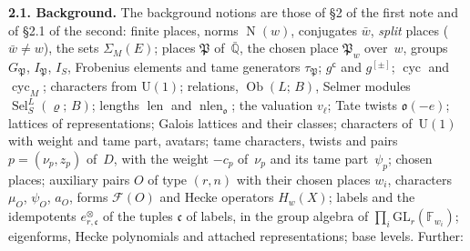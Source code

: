 \documentclass[11pt,a4paper]{article}
\newcommand{\F}{\mathbb{F}}
\newcommand{\len}{\operatorname{len}}
\newcommand{\m}[1]{\mbox{$#1$}}        %
\newcommand{\subhead}[1]{\par\addvspace{9pt plus 2pt}\Needspace{4\baselineskip}\noindent\textbf{#1}\enspace\ignorespaces}
\theoremstyle{plainx}
\theoremstyle{uprightx}
\newcommand{\Qb}{\bar{\mathbb{Q}}}
\newcommand{\cyc}{\operatorname{cyc}}
\newcommand{\vl}{v_\ell}
\newcommand{\Sel}[4]{\operatorname{Sel}_{#2}^{#3}(#1;\,#4)}
\newcommand{\Ob}[2]{\operatorname{Ob}(#1;\,#2)}
\newcommand{\pd}[2]{\Sigma_{#2}(#1)}
\newcommand{\inab}[1]{I_{#1}}
\newcommand{\cj}[1]{\bar{#1}}
\newcommand{\Nm}{\operatorname{N}}
\newcommand{\nlen}{\operatorname{nlen}}
\newcommand{\fo}{\mathfrak{o}}
\newcommand{\fP}{\mathfrak{P}}
\newcommand{\GL}{\mathrm{GL}}
\newcommand{\tupleIdem}[2]{e^{\otimes}_{#1,#2}}   %
\begin{document}
\subhead{2.1. Background.} The background notions are those of §2 of the first note and of §2.1 of the second:
finite places, norms \m{\Nm(w)}, conjugates \m{\cj{w}}, \emph{split} places (\m{\cj{w}\ne w}), the sets
\m{\pd{E}{M}}; places $\fP$ of~\m{\Qb}, the chosen place \m{\fP_w} over~$w$, groups \m{G_{\fP}}, \m{I_{\fP}},
\m{\inab{S}}, Frobenius elements and tame generators \m{\tau_{\fP}}; \m{g^{\mathsf c}} and \m{g^{[\pm]}};
\m{\cyc} and \m{\cyc_M}; characters from $\mathrm{U}(1)$; relations, \m{\Ob{L}{B}}, Selmer modules
\m{\Sel{\varrho}{S}{L}{B}}; lengths \m{\len} and \m{\nlen_{\fo}}; the valuation \m{\vl}; Tate twists \m{\fo(-e)};
lattices of representations; Galois lattices and their classes; characters of~$\mathrm{U}(1)$ with weight and
tame part, avatars; tame characters, twists and pairs \m{p=(\nu_p,z_p)} of~$D$, with the weight \m{-c_p} of~\m{\nu_p}
and its tame part~$\psi_p$; chosen places; auxiliary pairs $O$ of type \m{(r,n)} with their chosen places \m{w_i},
characters \m{\mu_O}, \m{\psi_O}, \m{a_O}, forms \m{\mathcal{F}(O)} and Hecke operators \m{H_w(X)}; labels and the
idempotents \m{\tupleIdem{r}{\mathfrak{c}}} of the tuples $\mathfrak{c}$ of labels, in the group algebra of \m{\prod_i\GL_r(\F_{w_i})}; eigenforms, Hecke polynomials and attached representations; base levels. Further:
\end{document}
